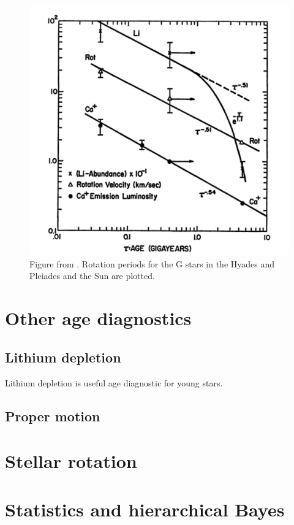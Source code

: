 \begin{figure}
\begin{center}
\includegraphics[width=6in, clip=true]{figures/skumanich.pdf}
\caption{Figure from \citet{skumanich1972}. Rotation periods for the G stars
in the Hyades and Pleiades and the Sun are plotted.}
\label{fig:skumanich}
\end{center}
\end{figure}



\section{Other age diagnostics}

\subsection{Lithium depletion}
Lithium depletion is useful age diagnostic for young stars.

\subsection{Proper motion}

\section{Stellar rotation}

\section{Statistics and hierarchical Bayes}
